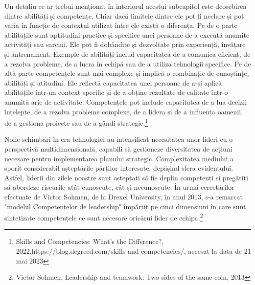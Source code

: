 \documentclass[a4paper, 12pt]{article}
\begin{document}
	\quad  Un detaliu ce ar trebui menționat în interiorul acestui subcapitol este deosebirea dintre abilități și competențe. Chiar dacă limitele dintre ele pot fi neclare și pot varia în funcție de contextul utilizat între ele există o diferența. Pe de o parte abilitățile sunt aptitudini practice și specifice unei persoane de a execută anumite activități sau sarcini. Ele pot fi dobândite și dezvoltate prin experiență, învățare și antrenament. Exemple de abilități includ capacitatea de a comunica eficient, de a rezolva probleme, de a lucra în echipă sau de a utiliza tehnologii specifice. Pe de altă parte competențele sunt mai complexe și implică o combinație de cunoștințe, abilități și atitudini. Ele reflectă capacitatea unei persoane de a-și aplică abilitățile într-un context specific și de a obține rezultate de calitate într-o anumită arie de activitate. Competențele pot include capacitatea de a lua decizii înțelepte, de a rezolva probleme complexe, de a lidera și de a influența oamenii, de a gestiona proiecte sau de a gândi strategic.\footnote{Skills and Competencies: What’s the Difference?, 2022,https://blog.degreed.com/skills-and-competencies/, accesat la data de 21 mai 2023}
		
	\quad\quad Noile schimbări în era tehnologiei au intensificat necesitatea unor lideri cu o perspectivă multidimensională, capabili să gestioneze diversitatea de acțiuni necesare pentru implementarea planului strategic. Complexitatea mediului a sporit considerabil așteptările părților interesate, depășind sfera evidentului. Astfel, liderii din zilele noastre sunt așteptați să fie deplin competenți și pregătiți să abordeze riscurile atât cunoscute, cât și necunoscute. În urmă cercetărilor efectuate de Victor Sohmen, de la Drexel University, în anul 2013, s-a remarcat "modelul Competențelor de leadership" împărțit pe cinci dimensiuni în care sunt sintetizate competențele ce sunt necesare oricărui lider de echipa.\footnote {Victor Sohmen, Leadership and teamwork: Two sides of the same coin, 2013}
\end{document}

